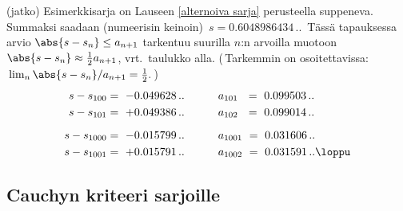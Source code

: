 \jatko \begin{Exa} (jatko) Esimerkkisarja on Lauseen \ref{alternoiva sarja} perusteella
suppeneva. Summaksi saadaan (numeerisin keinoin) $\,s=0.6048986434\,..\,$ Tässä
tapauksessa arvio $\abs{s-s_n} \le a_{n+1}$ tarkentuu suurilla $n$:n arvoilla muotoon
$\abs{s-s_n} \approx \tfrac{1}{2}a_{n+1}$, vrt.\ taulukko alla. (\,Tarkemmin on
osoitettavissa: $\,\lim_n\abs{s-s_n}/a_{n+1}=\tfrac{1}{2}.\,$)
\begin{align*}
s - s_{100}        &=\ -0.049628\,.. \qquad\quad a_{101}\ \ =\ 0.099503\,.. \\
s - s_{101}        &=\ +0.049386\,.. \qquad\quad a_{102}\ \ =\ 0.099014\,.. \\[2mm]
s - s_{1000}       &=\ -0.015799\,.. \qquad\quad a_{1001}\  =\ 0.031606\,.. \\
s - s_{1001}       &=\ +0.015791\,.. \qquad\quad a_{1002}\  =\ 0.031591\,.. \loppu
\end{align*}
\end{Exa}

\subsection*{Cauchyn kriteeri sarjoille}

